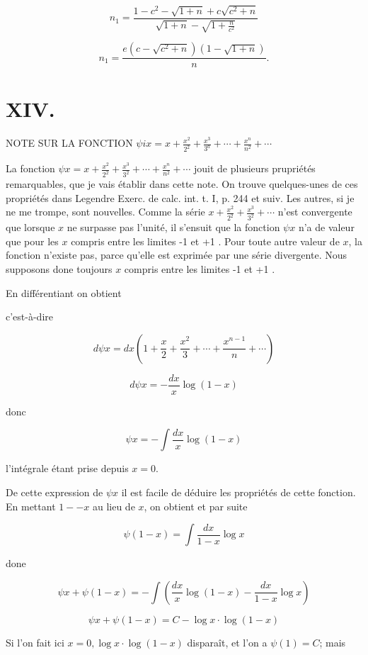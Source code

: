 \documentclass{article}
\begin{document}
\[
n_{1}=\frac{1-c^{2}-\sqrt{1+n}+c \sqrt{c^{2}+n}}{\sqrt{1+n}-\sqrt{1+\frac{n}{c^{2}}}}
\]

\[
n_{1}=\frac{e\left(c-\sqrt{c^{2}+n}\right)(1-\sqrt{1+n})}{n} .
\]

\section*{XIV.}

NOTE SUR LA FONCTION \(\psi i x=x+\frac{x^{2}}{2^{2}}+\frac{x^{3}}{3^{a}}+\cdots+\frac{x^{n}}{n^{2}}+\cdots\)

La fonction \(\psi x=x+\frac{x^{2}}{2^{2}}+\frac{x^{3}}{3^{2}}+\cdots+\frac{x^{n}}{n^{2}}+\cdots\) jouit de plusieurs prupriétés remarquables, que je vais établir dans cette note. On trouve quelques-unes de ces propriétés dans Legendre Exerc. de calc. int. t. I, p. 244 et suiv. Les autres, si je ne me trompe, sont nouvelles. Comme la série \(x+\frac{x^{2}}{2^{2}}+\frac{x^{3}}{3^{2}}+\cdots\) n'est convergente que lorsque \(x\) ne surpasse pas l'unité, il s'ensuit que la fonction \(\psi x\) n'a de valeur que pour les \(x\) compris entre les limites -1 et +1 . Pour toute autre valeur de \(x\), la fonction n'existe pas, parce qu'elle est exprimée par une série divergente. Nous supposons done toujours \(x\) compris entre les limites -1 et +1 .

En différentiant on obtient

c'est-à-dire

\[
d \psi x=d x\left(1+\frac{x}{2}+\frac{x^{2}}{3}+\cdots+\frac{x^{n-1}}{n}+\cdots\right)
\]

\[
d \psi x=-\frac{d x}{x} \log (1-x)
\]

donc

\[
\psi x=-\int \frac{d x}{x} \log (1-x)
\]

l'intégrale étant prise depuis \(x=0\).

De cette expression de \(\psi x\) il est facile de déduire les propriétés de cette fonction. En mettant \(1--x\) au lieu de \(x\), on obtient
et par suite

\[
\psi(1-x)=\int \frac{d x}{1-x} \log x
\]

done

\[
\psi x+\psi(1-x)=-\int\left(\frac{d x}{x} \log (1-x)-\frac{d x}{1-x} \log x\right)
\]

\[
\psi x+\psi(1-x)=C-\log x \cdot \log (1-x)
\]

Si l'on fait ici \(x=0, \log x \cdot \log (1-x)\) disparaît, et l'on a \(\psi(1)=C\); mais
\end{document}
